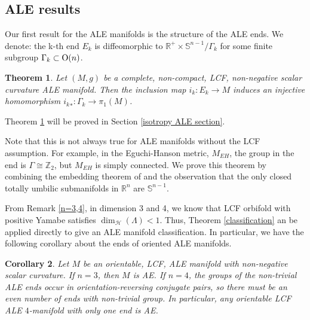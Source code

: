 \documentclass[12pt]{amsart}
\newtheorem{theorem}{Theorem}[section]
\newtheorem{corollary}[theorem]{Corollary}
\theoremstyle{definition}
\begin{document}



\subsection{ALE results}

Our first result for the ALE manifolds is the structure of the ALE ends. We denote: the k-th end $E_k$ is diffeomorphic to $\mathbb{R}^+\times\mathbb{S}^{n-1}/\Gamma_k$ for some finite subgroup $\Gamma_k\subset {\rm{O}}(n)$.

\begin{theorem}\label{group injective}
    Let $(M,g)$ be a complete, non-compact, LCF, non-negative scalar curvature ALE manifold. Then the inclusion map $i_k:E_k \to M$ induces an injective homomorphism ${i_k}_*:\Gamma_k\to\pi_1(M)$.
\end{theorem}

Theorem \ref{group injective} will be proved in Section \ref{isotropy ALE section}. 

Note that this is not always true for ALE manifolds without the LCF assumption. For example, in the Eguchi-Hanson metric, $M_{EH}$, the group in the end is $\Gamma\cong \mathbb{Z}_2$, but $M_{EH}$ is simply connected. We prove this theorem by combining the embedding theorem of \cite{SYconformal} and the observation that the only closed totally umbilic submanifolds in $\mathbb{R}^n$ are $\mathbb{S}^{n-1}$. 

From Remark \ref{n=3,4}, in dimension 3 and 4, we know that LCF orbifold with positive Yamabe satisfies $\operatorname{dim}_\mathcal{H}(\Lambda)<1$. Thus, Theorem \ref{classification} an be applied directly to give an ALE manifold classification. In particular, we have the following corollary about the ends of oriented ALE manifolds.
\begin{corollary} Let $M$ be an orientable, LCF, ALE manifold with non-negative scalar curvature. If $n = 3$, then $M$ is AE. If $n=4$, the groups of the non-trivial ALE ends occur in orientation-reversing conjugate pairs, so there must be an even number of ends with non-trivial group. In particular, any orientable LCF ALE $4$-manifold with only one end is AE. 
\end{corollary}
\end{document}
